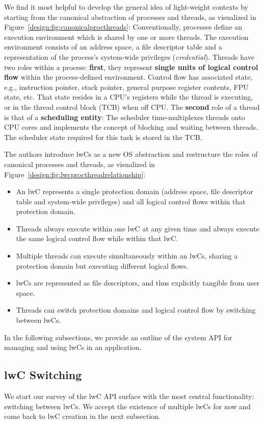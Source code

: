 \documentclass[10pt,twocolumn,a4paper]{article}
\begin{document}
We find it most helpful to develop the general idea of light-weight contexts by starting from the canonical abstraction of processes and threads, as visualized in Figure~\ref{design:fig:canonicalprocthreads}:
Conventionally, processes define an execution environment which is shared by one or more threads.
The execution environment consists of an address space, a file descriptor table and a representation of the process's system-wide privileges (\textit{credential}).
Threads have two roles within a process:
\textbf{first}, they represent \textbf{single units of logical control flow} within the process-defined environment.
Control flow has associated state, e.g., instruction pointer, stack pointer, general purpose register contents, FPU state, etc.
That state resides in a CPU's registers while the thread is executing, or in the thread control block (TCB) when off CPU.
The \textbf{second} role of a thread is that of a \textbf{scheduling entity}:
The scheduler time-multiplexes threads onto CPU cores and implements the concept of blocking and waiting between threads.
The scheduler state required for this task is stored in the TCB.

The authors introduce lwCs as a new OS abstraction and restructure the roles of canonical processes and threads, as visualized in Figure~\ref{design:fig:lwcprocthreadrelationship}:
\begin{itemize}
\item An lwC represents a single protection domain (address space, file descriptor table and system-wide privileges) and all logical control flows within that protection domain.
\item Threads always execute within one lwC at any given time and always execute the same logical control flow while within that lwC.
\item Multiple threads can execute simultaneously within an lwCs, sharing a protection domain but executing different logical flows.
\item lwCs are represented as file descriptors, and thus explicitly tangible from user space.
\item Threads can switch protection domains and logical control flow by switching between lwCs.
\end{itemize}
\cite{lwcpaper,lwckernelrepo}

In the following subsections, we provide an outline of the system API for managing and using lwCs in an application.

\subsection{lwC Switching}\label{design:switching}
We start our survey of the lwC API surface with the most central functionality: switching between lwCs.
We accept the existence of multiple lwCs for now and come back to lwC creation in the next subsection.
\end{document}
